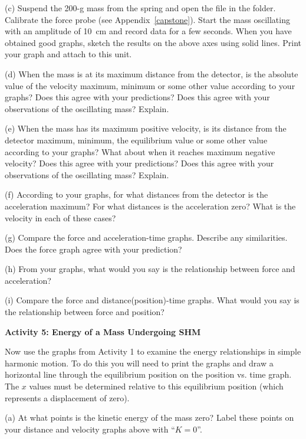 (c) Suspend the 200-g mass from the spring and open the file  in the \filename{\coursefolder} folder. Calibrate the force probe (see Appendix~\ref{capstone}).
Start the mass oscillating with an amplitude of 10~cm and record data for a few seconds.
When you have obtained good graphs, sketch the results on the above axes using
solid lines. Print your graph and attach to this unit.

(d) When the mass is at its maximum distance from the detector, is the absolute
 value of the velocity
maximum, minimum or some other value according to your graphs? Does this agree
with your predictions? Does this agree with your observations of the oscillating
mass? Explain.
\answerspace{15mm}

\pagebreak[2]
(e) When the mass has its maximum positive velocity, is its distance from the
detector maximum, minimum, the equilibrium value or some other value according
to your graphs? What about when it reaches maximum negative velocity? Does this
agree with your predictions? Does this agree with your observations of the 
oscillating mass? Explain. 
\answerspace{10mm}

(f) According to your graphs, for what distances from the detector is the 
acceleration maximum? For what distances is the acceleration zero? What is the 
velocity in each of these cases?
\answerspace{20mm}

(g) Compare the force and acceleration-time graphs. Describe any similarities.
Does the force graph agree with your prediction?
\answerspace{20mm}

(h) From your graphs, what would you say is the relationship between force and
acceleration? 
\answerspace{20mm}

(i) Compare the force and distance(position)-time graphs. What would you say
is the relationship between force and position? 
\answerspace{20mm}

\textbf{Activity 5: Energy of a Mass Undergoing SHM }

Now use the graphs from Activity 1 to examine the energy relationships
in simple harmonic motion. To do this you will need to print the graphs and draw a horizontal line through the equilibrium position on the position vs. time graph.  
The $x$ values must be determined relative to this equilibrium position (which represents a displacement of zero).

(a) At what points is the kinetic energy of the mass zero? Label these points
on your distance and velocity graphs above with ``$K=0$''.

